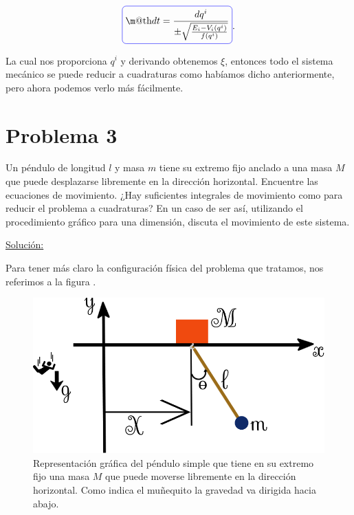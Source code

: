 \documentclass[a4paper,10pt]{article}
\makeatletter
\numberwithin{equation}{section}
\newcommand*{\boxcolor}{blue}
\renewcommand{\boxed}[1]{\textcolor{\boxcolor}{%
\tikz[baseline={([yshift=-1ex]current bounding box.center)}] \node [rectangle, minimum width=1ex,rounded corners,draw] {\normalcolor\m@th$\displaystyle#1$};}}
\makeatother
\begin{document}
\begin{equation}
 \boxed{dt = \frac{dq^i}{\pm \sqrt{\frac{E_i - V_i(q^i)}{f(q^i)}}}}.
 \label{eq:3final}
\end{equation}

La cual nos proporciona $q^i$ y derivando obtenemos $\xi$, entonces todo el sistema 
mecánico se puede reducir a cuadraturas como habíamos dicho anteriormente, pero ahora 
podemos verlo más fácilmente.

\section{Problema 3}

Un péndulo de longitud $l$ y masa $m$ tiene su extremo fijo anclado a una masa $M$ que 
puede desplazarse libremente en la dirección horizontal. Encuentre las ecuaciones de 
movimiento. ¿Hay suficientes integrales de movimiento como para reducir el problema 
a cuadraturas? En un caso de ser así, utilizando el procedimiento gráfico para una 
dimensión, discuta el movimiento de este sistema.

\vspace{.3cm}

\underline{Solución:} \vspace{.3cm}

Para tener más claro la configuración física del problema que tratamos, nos referimos 
a la figura .

\begin{figure}[H]
 \center
 \includegraphics[scale=0.4]{problema3fig1}
 \caption{Representación gráfica del péndulo simple que tiene en su extremo fijo 
 una masa $M$ que puede moverse libremente en la dirección horizontal. Como indica 
 el muñequito la gravedad va dirigida hacia abajo.}
 \label{fig:problema3fig1}
\end{figure}
\end{document}
